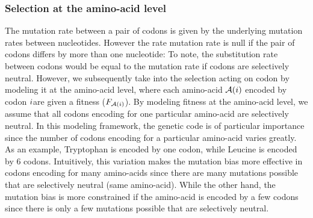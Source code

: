 \subsubsection{Selection at the amino-acid level}
\label{sec-mut-bias:aa-selection}
The mutation rate between a pair of \glspl{codon} is given by the underlying mutation rates between nucleotides.
However the rate mutation rate is null if the pair of \glspl{codon} differs by more than one nucleotide:
To note, the \gls{substitution} rate between \glspl{codon} would be equal to the mutation rate if \glspl{codon} are selectively \gls{neutral}.
However, we subsequently take into the selection acting on \gls{codon} by modeling it at the amino-acid level, where each amino-acid $\mathcal{A}({i})$ encoded by \gls{codon} ${i} $are given a fitness ($F_{\mathcal{A}({i})}$).
By modeling fitness at the amino-acid level, we assume that all \glspl{codon} encoding for one particular amino-acid are selectively \gls{neutral}.
In this modeling framework, the genetic code is of particular importance since the number of \glspl{codon} encoding for a particular amino-acid varies greatly.
As an example, Tryptophan is encoded by one \gls{codon}, while Leucine is encoded by 6 \glspl{codon}.
Intuitively, this variation makes the mutation bias more effective in \glspl{codon} encoding for many amino-acids since there are many mutations possible that are selectively \gls{neutral} (same amino-acid).
While the other hand, the mutation bias is more constrained if the amino-acid is encoded by a few \glspl{codon} since there is only a few mutations possible that are selectively \gls{neutral}.\\

